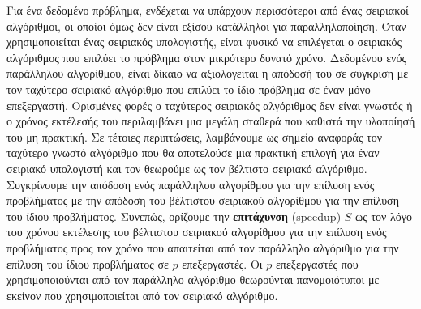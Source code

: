 \documentclass[12pt,a4paper]{article}
\begin{document}
Για ένα δεδομένο πρόβλημα, ενδέχεται να υπάρχουν περισσότεροι από ένας
σειριακοί αλγόριθμοι, οι οποίοι όμως δεν είναι εξίσου κατάλληλοι για
παραλληλοποίηση. Όταν χρησιμοποιείται ένας σειριακός υπολογιστής, είναι
φυσικό να επιλέγεται ο σειριακός αλγόριθμος που επιλύει το πρόβλημα στον
μικρότερο δυνατό χρόνο. Δεδομένου ενός παράλληλου αλγορίθμου, είναι
δίκαιο να αξιολογείται η απόδοσή του σε σύγκριση με τον ταχύτερο
σειριακό αλγόριθμο που επιλύει το ίδιο πρόβλημα σε έναν μόνο
επεξεργαστή. Ορισμένες φορές ο ταχύτερος σειριακός αλγόριθμος δεν είναι
γνωστός ή ο χρόνος εκτέλεσής του περιλαμβάνει μια μεγάλη σταθερά που
καθιστά την υλοποίησή του μη πρακτική. Σε τέτοιες περιπτώσεις,
λαμβάνουμε ως σημείο αναφοράς τον ταχύτερο γνωστό αλγόριθμο που θα
αποτελούσε μια πρακτική επιλογή για έναν σειριακό υπολογιστή και τον
θεωρούμε ως τον βέλτιστο σειριακό αλγόριθμο. Συγκρίνουμε την απόδοση
ενός παράλληλου αλγορίθμου για την επίλυση ενός προβλήματος με την
απόδοση του βέλτιστου σειριακού αλγορίθμου για την επίλυση του ίδιου
προβλήματος. Συνεπώς, ορίζουμε την \textbf{επιτάχυνση}
(\foreignlanguage{english}{speedup}) $S$ ως τον λόγο του χρόνου
εκτέλεσης του βέλτιστου σειριακού αλγορίθμου για την επίλυση ενός
προβλήματος προς τον χρόνο που απαιτείται από τον παράλληλο αλγόριθμο
για την επίλυση του ίδιου προβλήματος σε $p$ επεξεργαστές. Οι $p$
επεξεργαστές που χρησιμοποιούνται από τον παράλληλο αλγόριθμο
θεωρούνται πανομοιότυποι με εκείνον που χρησιμοποιείται από τον
σειριακό αλγόριθμο.
\end{document}
